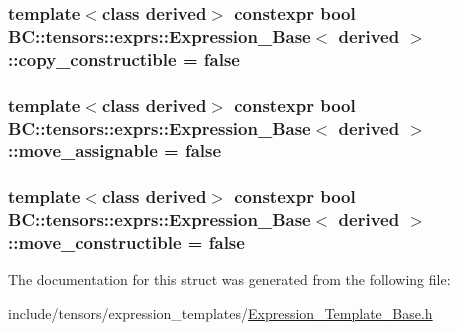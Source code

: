 \subsubsection[{\texorpdfstring{copy\+\_\+constructible}{copy_constructible}}]{\setlength{\rightskip}{0pt plus 5cm}template$<$class derived$>$ constexpr bool {\bf B\+C\+::tensors\+::exprs\+::\+Expression\+\_\+\+Base}$<$ derived $>$\+::copy\+\_\+constructible = false\hspace{0.3cm}{\ttfamily [static]}}\hypertarget{structBC_1_1tensors_1_1exprs_1_1Expression__Base_ad737799cc3f702fa115fb70f32fe1b6f}{}\label{structBC_1_1tensors_1_1exprs_1_1Expression__Base_ad737799cc3f702fa115fb70f32fe1b6f}
\subsubsection[{\texorpdfstring{move\+\_\+assignable}{move_assignable}}]{\setlength{\rightskip}{0pt plus 5cm}template$<$class derived$>$ constexpr bool {\bf B\+C\+::tensors\+::exprs\+::\+Expression\+\_\+\+Base}$<$ derived $>$\+::move\+\_\+assignable = false\hspace{0.3cm}{\ttfamily [static]}}\hypertarget{structBC_1_1tensors_1_1exprs_1_1Expression__Base_af389898e11140b172a9e76349609c8d9}{}\label{structBC_1_1tensors_1_1exprs_1_1Expression__Base_af389898e11140b172a9e76349609c8d9}
\subsubsection[{\texorpdfstring{move\+\_\+constructible}{move_constructible}}]{\setlength{\rightskip}{0pt plus 5cm}template$<$class derived$>$ constexpr bool {\bf B\+C\+::tensors\+::exprs\+::\+Expression\+\_\+\+Base}$<$ derived $>$\+::move\+\_\+constructible = false\hspace{0.3cm}{\ttfamily [static]}}\hypertarget{structBC_1_1tensors_1_1exprs_1_1Expression__Base_a6075383ba539f5128e7270ccd2cfdd7a}{}\label{structBC_1_1tensors_1_1exprs_1_1Expression__Base_a6075383ba539f5128e7270ccd2cfdd7a}


The documentation for this struct was generated from the following file\+:\begin{DoxyCompactItemize}
\item 
include/tensors/expression\+\_\+templates/\hyperlink{Expression__Template__Base_8h}{Expression\+\_\+\+Template\+\_\+\+Base.\+h}\end{DoxyCompactItemize}
